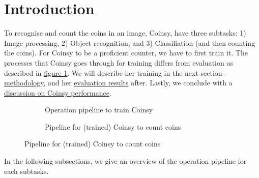 \documentclass[main.tex]{subfiles}
\begin{document}
\section[intro]{Introduction\hypertarget{sec:intro}{}}


\par
To recognise and count the coins in an image, Coinsy, have three subtasks: 1) Image processing, 2) Object recognition, and 3) Classifiation (and then counting the coins).
For Coinsy to be a proficient counter, we have to first train it. The processes that Coinsy goes through for training differs from evaluation as described in \href{trgVSeval}{figure \ref*{trgVSeval}}. We will describe her training in the next section - \hyperlink{method}{methodology}, and her \hyperlink{resut}{evaluation results} after. Lastly, we conclude with a \hyperlink{discussion}{discussion on Coinsy performance}.

\begin{figure}[!t]
  \begin{subfigure}[!b]{0.5\textwidth}
    \centering
    \resizebox{\linewidth}{!}{}
    \caption{Operation pipeline to train Coinsy}
  \end{subfigure}
  \begin{subfigure}[!b]{0.5\textwidth}
    \centering
    \resizebox{\linewidth}{!}{}
    \caption{Pipeline for (trained) Coinsy to count coins}
  \end{subfigure}
  \label{trgVSeval}
\end{figure}

In the following subsections, we give an overview of the operation pipeline for each subtasks.

%     
\end{document}
